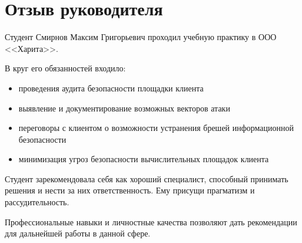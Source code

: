 \thispagestyle{empty}
\section*{Отзыв руководителя}

Студент Смирнов Максим Григорьевич проходил учебную практику в ООО <<Харита>>.

В круг его обязанностей входило: 
\begin{itemize}
	\item проведения аудита безопасности площадки клиента
	\item выявление и документирование возможных векторов атаки
	\item переговоры с клиентом о возможности устранения брешей информационной безопасности
	\item минимизация угроз безопасности вычислительных площадок клиента
\end{itemize}

Студент зарекомендовала себя как хороший специалист, способный принимать решения и нести за них ответственность. Ему присущи прагматизм и рассудительность.

Профессиональные навыки и личностные качества позволяют  дать рекомендации для дальнейшей работы в данной сфере.

\setcounter{page}{1}